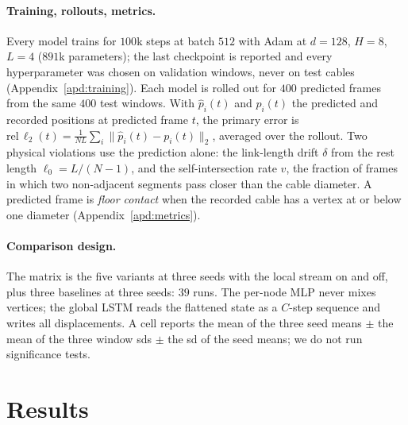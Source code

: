 \documentclass[mlabstract,onecolumn]{jmlr}
\newcommand{\rel}{\mathrm{rel}\,\ell_2}
\begin{document}
\paragraph{Training, rollouts, metrics.}
Every model trains for $100$k steps at batch $512$ with Adam at $d{=}128$,
$H{=}8$, $L{=}4$ ($891$k parameters); the last checkpoint is reported and
every hyperparameter was chosen on validation windows, never on test cables
(Appendix~\ref{apd:training}). Each model is rolled out for
$400$ predicted frames from the same $400$ test windows. With
$\hat p_i(t)$ and $p_i(t)$ the predicted and recorded positions at predicted
frame $t$, the primary error is
$\rel(t)=\tfrac{1}{NL}\sum_i\|\hat p_i(t)-p_i(t)\|_2$, averaged over the
rollout. Two physical violations use the prediction alone: the link-length
drift $\delta$ from the rest length $\ell_0=L/(N-1)$, and the
self-intersection rate $v$, the fraction of frames in which two non-adjacent
segments pass closer than the cable diameter. A predicted frame is \emph{floor
contact} when the recorded cable has a vertex at or below one diameter
(Appendix~\ref{apd:metrics}).

\paragraph{Comparison design.}
The matrix is the five variants at three seeds with the local stream on and
off, plus three baselines at three seeds: $39$ runs. The per-node MLP never
mixes vertices; the global LSTM reads the flattened state as a $C$-step
sequence and writes all displacements. A cell reports the mean of the three
seed means $\pm$ the mean of the three window sds $\pm$ the sd of the seed
means; we do not run significance tests.

\section{Results}
\label{sec:results}
\end{document}
